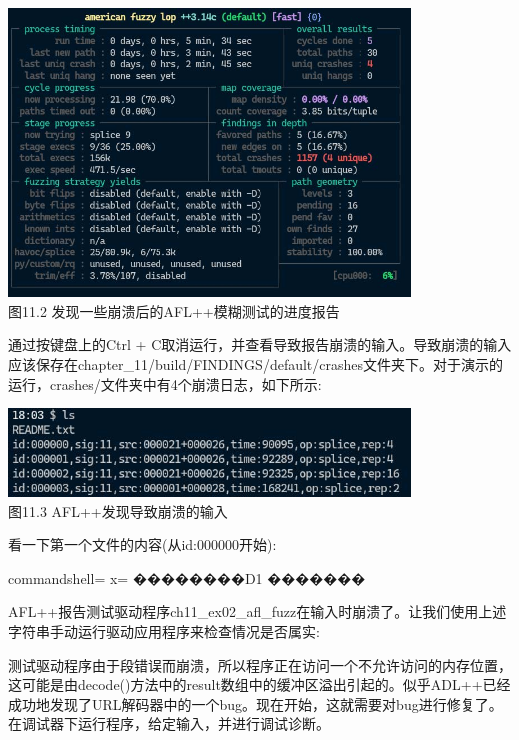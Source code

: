 \begin{center}
\includegraphics[width=0.8\textwidth]{content/2/chapter11/images/2.jpg}\\
图11.2 发现一些崩溃后的AFL++模糊测试的进度报告
\end{center}

通过按键盘上的Ctrl + C取消运行，并查看导致报告崩溃的输入。导致崩溃的输入应该保存在chapter\_11/build/FINDINGS/default/crashes文件夹下。对于演示的运行，crashes/文件夹中有4个崩溃日志，如下所示:

\begin{center}
\includegraphics[width=0.8\textwidth]{content/2/chapter11/images/3.jpg}\\
图11.3 AFL++发现导致崩溃的输入
\end{center}

看一下第一个文件的内容(从id:000000开始):

\begin{tcblisting}{commandshell={}}
x=%
��������D1%
�������%
\end{tcblisting}

AFL++报告测试驱动程序ch11\_ex02\_afl\_fuzz在输入时崩溃了。让我们使用上述字符串手动运行驱动应用程序来检查情况是否属实:


测试驱动程序由于段错误而崩溃，所以程序正在访问一个不允许访问的内存位置，这可能是由decode()方法中的result数组中的缓冲区溢出引起的。似乎ADL++已经成功地发现了URL解码器中的一个bug。现在开始，这就需要对bug进行修复了。在调试器下运行程序，给定输入，并进行调试诊断。








